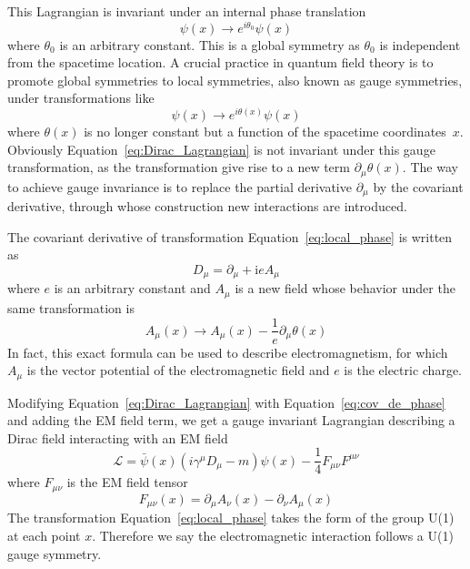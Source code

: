 This Lagrangian is invariant under an internal phase translation
\begin{equation}\label{eq:global_phase}
    \psi(x) \to e^{i\theta_{0}}\psi(x)
\end{equation}
where $\theta_{0}$ is an arbitrary constant.
This is a global symmetry as $\theta_{0}$ is independent from the spacetime location.
A crucial practice in quantum field theory is to promote global symmetries to local symmetries, 
also known as gauge symmetries, under transformations like
\begin{equation}\label{eq:local_phase}
 \psi(x) \to e^{i\theta(x)}\psi(x)
\end{equation}
where $\theta(x)$ is no longer constant but a function of the spacetime coordinates~$x$.
Obviously Equation~\ref{eq:Dirac_Lagrangian} is not invariant under this gauge transformation, 
as the transformation give rise to a new term $\partial_{\mu}\theta(x)$.
The way to achieve gauge invariance is to replace the partial derivative $\partial_{\mu}$ by the covariant derivative, 
through whose construction new interactions are introduced.

The covariant derivative of transformation Equation~\ref{eq:local_phase} is written as
\begin{equation}\label{eq:cov_de_phase}
    D_{\mu} = \partial_{\mu} + \text{i}eA_{\mu}
\end{equation}
where $e$ is an arbitrary constant and $A_{\mu}$ is a new field whose behavior under the same transformation is
\begin{equation}\label{eq:EM_transformation}
    A_{\mu}(x) \to A_{\mu}(x) - \frac{1}{e}\partial_{\mu}\theta(x)
\end{equation}
In fact, this exact formula can be used to describe electromagnetism, 
for which $A_{\mu}$ is the vector potential of the electromagnetic field and $e$ is the electric charge.

Modifying Equation~\ref{eq:Dirac_Lagrangian} with Equation~\ref{eq:cov_de_phase} and adding the EM field term, 
we get a gauge invariant Lagrangian describing a Dirac field interacting with an EM field
\begin{equation}\label{eq:Dirac_EM}
    \mathcal{L} = \bar{\psi}(x)(i\gamma^{\mu}D_{\mu}-m)\psi(x) - \frac{1}{4}F_{\mu\nu}F^{\mu\nu}
\end{equation}
where $F_{\mu\nu}$ is the EM field tensor
\begin{equation}\label{eq:EM_tensor}
    F_{\mu\nu}(x) = \partial_{\mu}A_{\nu}(x) - \partial_{\nu}A_{\mu}(x) 
\end{equation}
The transformation Equation~\ref{eq:local_phase} takes the form of the group U(1) at each point $x$.
Therefore we say the electromagnetic interaction follows a U(1) gauge symmetry.



